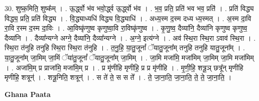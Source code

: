 \documentclass[17pt]{extarticle}
\begin{document}
30. शुष्क॒मिति॒ शुष्क᳚म् । . ऊ॒र्द्ध्वो भ॑व भवो॒र्द्ध्व ऊ॒र्द्ध्वो भ॑व । . भ॒व॒ प्रति॒ प्रति॑ भव भव॒ प्रति॑ । . प्रति॑ विद्ध्य विद्ध्य॒ प्रति॒ प्रति॑ विद्ध्य । . वि॒द्ध्याध्यधि॑ विद्ध्य वि॒द्ध्याधि॑ । . अध्य॒स्म द॒स्म दध्य ध्य॒स्मत् । . अ॒स्म दा॒वि रा॒वि र॒स्म द॒स्म दा॒विः । . आ॒विष्कृ॑णुष्व कृणुष्वा॒वि रा॒विष्कृ॑णुष्व । . कृ॒णु॒ष्व॒ दैव्या॑नि॒ दैव्या॑नि कृणुष्व कृणुष्व॒ दैव्या॑नि । . दैव्या᳚न्यग्ने अग्ने॒ दैव्या॑नि॒ दैव्या᳚न्यग्ने । . अ॒ग्ने॒ इत्य॑ग्ने । . अव॑ स्थि॒रा स्थि॒रा ऽवाव॑ स्थि॒रा । . स्थि॒रा त॑नुहि तनुहि स्थि॒रा स्थि॒रा त॑नुहि । . त॒नु॒हि॒ या॒तु॒जूनां᳚ ॅयातु॒जूना᳚म् तनुहि तनुहि यातु॒जूना᳚म् । . या॒तु॒जूना᳚म् जा॒मिम् जा॒मिं ॅया॑तु॒जूनां᳚ ॅयातु॒जूना᳚म् जा॒मिम् । . जा॒मि मजा॑मि॒ मजा॑मिम् जा॒मिम् जा॒मि मजा॑मिम् । . अजा॑मि॒म् प्र प्राजा॑मि॒ मजा॑मि॒म् प्र । . प्र मृ॑णीहि मृणीहि॒ प्र प्र मृ॑णीहि । . मृ॒णी॒हि॒ शत्रू॒ञ् छत्रू᳚न् मृणीहि मृणीहि॒ शत्रून्॑ । . शत्रू॒निति॒ शत्रून्॑ । . स ते॑ ते॒ स स ते᳚ । . ते॒ जा॒ना॒ति॒ जा॒ना॒ति॒ ते॒ ते॒ जा॒ना॒ति॒ । \newline

\textbf{Ghana Paata } \newline
\end{document}
